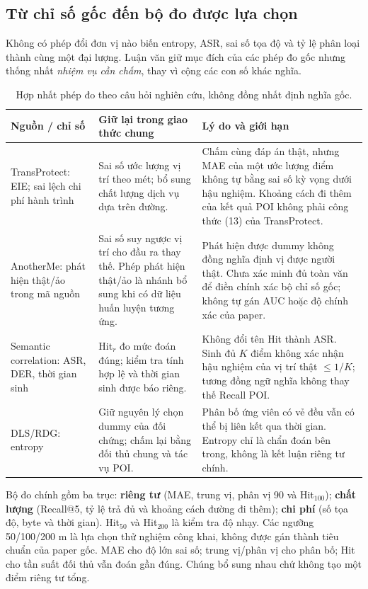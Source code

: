 \subsection{Từ chỉ số gốc đến bộ đo được lựa chọn}

Không có phép đổi đơn vị nào biến entropy, ASR, sai số tọa độ và tỷ lệ phân loại thành cùng một đại lượng. Luận văn giữ mục đích của các phép đo gốc nhưng thống nhất \emph{nhiệm vụ cần chấm}, thay vì cộng các con số khác nghĩa.

\begingroup\small{}
\begin{longtable}{P{3.0cm}P{5.1cm}P{6.25cm}}
\caption{Hợp nhất phép đo theo câu hỏi nghiên cứu, không đồng nhất định nghĩa gốc.}\label{tab:metric-decisions}\\
\toprule\textbf{Nguồn / chỉ số} & \textbf{Giữ lại trong giao thức chung} & \textbf{Lý do và giới hạn}\\\midrule\endhead
TransProtect: EIE; sai lệch chi phí hành trình~\cite{yadav2024transprotect}
& Sai số ước lượng vị trí theo mét; bổ sung chất lượng dịch vụ dựa trên đường.
& Chấm cùng đáp án thật, nhưng MAE của một ước lượng điểm không tự bằng sai số kỳ vọng dưới hậu nghiệm. Khoảng cách đi thêm của kết quả POI không phải công thức (13) của TransProtect.\\\midrule
AnotherMe: phát hiện thật/ảo trong mã nguồn~\cite{anothermecode}
& Sai số suy ngược vị trí cho đầu ra thay thế. Phép phát hiện thật/ảo là nhánh bổ sung khi có dữ liệu huấn luyện tương ứng.
& Phát hiện được dummy không đồng nghĩa định vị được người thật. Chưa xác minh đủ toàn văn để điền chính xác bộ chỉ số gốc; không tự gán AUC hoặc độ chính xác của paper.\\\midrule
Semantic correlation: ASR, DER, thời gian sinh~\cite{liu2026semantic}
& Hit$_r$ đo mức đoán đúng; kiểm tra tính hợp lệ và thời gian sinh được báo riêng.
& Không đổi tên Hit thành ASR. Sinh đủ $K$ điểm không xác nhận hậu nghiệm của vị trí thật $\leq1/K$; tương đồng ngữ nghĩa không thay thế Recall POI.\\\midrule
DLS/RDG: entropy~\cite{niu2014dls,shaham2021viterbi}
& Giữ nguyên lý chọn dummy của đối chứng; chấm lại bằng đối thủ chung và tác vụ POI.
& Phân bố ứng viên có vẻ đều vẫn có thể bị liên kết qua thời gian. Entropy chỉ là chẩn đoán bên trong, không là kết luận riêng tư chính.\\
\bottomrule
\end{longtable}\endgroup

Bộ đo chính gồm ba trục: \textbf{riêng tư} (MAE, trung vị, phân vị 90 và Hit$_{100}$); \textbf{chất lượng} (Recall@5, tỷ lệ trả đủ và khoảng cách đường đi thêm); \textbf{chi phí} (số tọa độ, byte và thời gian). Hit$_{50}$ và Hit$_{200}$ là kiểm tra độ nhạy. Các ngưỡng 50/100/200 m là lựa chọn thử nghiệm công khai, không được gán thành tiêu chuẩn của paper gốc. MAE cho độ lớn sai số; trung vị/phân vị cho phân bố; Hit cho tần suất đối thủ vẫn đoán gần đúng. Chúng bổ sung nhau chứ không tạo một điểm riêng tư tổng.

